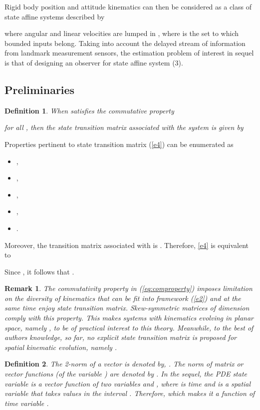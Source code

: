 \documentclass[12pt,draftcls,onecolumn]{IEEEtran}
\newtheorem{df}{Definition}
\newtheorem{rem}{Remark}
\newcommand{\carrew} {\hfill }
\begin{document}
Rigid body position and attitude kinematics can then be considered as a class of state affine systems described by

where angular and linear velocities are lumped in , where  is the set to which bounded inputs belong.
Taking into account the delayed stream of information from landmark measurement sensors, the estimation problem of interest in sequel is that of designing an observer for state affine system (3).


\subsection{Preliminaries}

\begin{df} \label{def1}  \cite{c17} When   satisfies the commutative property

for all , then the state transition matrix associated with the system   is given by
  \carrew
\end{df}
Properties pertinent to state transition matrix (\ref{e4}) can be enumerated as
\begin{itemize}
\item[1)] ,
\item[2)] ,
\item[3)] ,
\item[4)] ,
\item[5)] .
\end{itemize}
Moreover, the transition matrix associated with  is . Therefore,  \eqref{e4} is equivalent to  

Since , it follows that .

\begin{rem} \label{remlimit}
The commutativity property in (\ref{eq:comproperty}) imposes limitation on the diversity of kinematics that can be fit into framework (\ref{e2}) and at the same time enjoy state transition matrix. Skew-symmetric matrices of dimension  comply with this property. This makes systems with kinematics evolving in planar space, namely , to be of practical interest to this theory. Meanwhile, to the best of authors knowledge, so far, no explicit state transition matrix is proposed for spatial kinematic evolution, namely .
\end{rem} \carrew


\begin{df} \label{def2} The 2-norm of a vector is denoted by, . The  norm of  matrix or vector functions (of the variable ) are denoted by . In the sequel, the PDE state variable  is a vector function of two variables  and , where  is time and  is a spatial variable that takes values in the interval . Therefore,  which makes it a function of time variable  \cite{c16}.  \carrew
\end{df}
\end{document}
